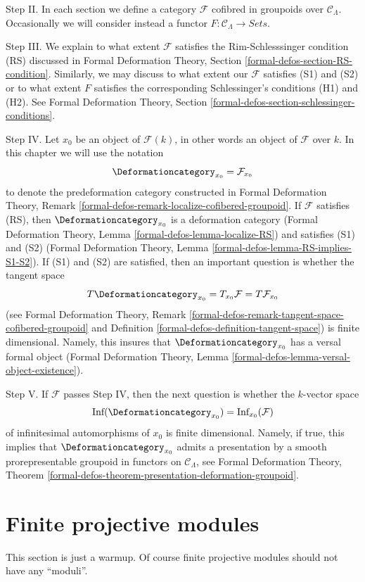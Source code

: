\medskip\noindent
Step II. In each section we define a category $\mathcal{F}$
cofibred in groupoids over $\mathcal{C}_\Lambda$. Occasionally
we will consider instead a functor
$F : \mathcal{C}_\Lambda \to \textit{Sets}$.

\medskip\noindent
Step III. We explain to what extent $\mathcal{F}$ satisfies
the Rim-Schlesssinger condition (RS) discussed in
Formal Deformation Theory, Section \ref{formal-defos-section-RS-condition}.
Similarly, we may discuss to what extent our $\mathcal{F}$
satisfies (S1) and (S2) or to what extent $F$ satisfies
the corresponding Schlessinger's conditions (H1) and (H2).
See Formal Deformation Theory, Section
\ref{formal-defos-section-schlessinger-conditions}.

\medskip\noindent
Step IV. Let $x_0$ be an object of $\mathcal{F}(k)$, in other words an object
of $\mathcal{F}$ over $k$. In this chapter we will use the notation
$$
\Deformationcategory_{x_0} = \mathcal{F}_{x_0}
$$
to denote the predeformation category constructed in
Formal Deformation Theory, Remark
\ref{formal-defos-remark-localize-cofibered-groupoid}.
If $\mathcal{F}$ satisfies (RS), then
$\Deformationcategory_{x_0}$ is a deformation category
(Formal Deformation Theory, Lemma
\ref{formal-defos-lemma-localize-RS})
and satisfies (S1) and (S2)
(Formal Deformation Theory, Lemma
\ref{formal-defos-lemma-RS-implies-S1-S2}).
If (S1) and (S2) are satisfied, then
an important question is whether the tangent space
$$
T\Deformationcategory_{x_0} = T_{x_0}\mathcal{F} = T\mathcal{F}_{x_0}
$$
(see Formal Deformation Theory, Remark
\ref{formal-defos-remark-tangent-space-cofibered-groupoid} and
Definition \ref{formal-defos-definition-tangent-space})
is finite dimensional. Namely, this insures that
$\Deformationcategory_{x_0}$ has a versal formal object
(Formal Deformation Theory, Lemma
\ref{formal-defos-lemma-versal-object-existence}).

\medskip\noindent
Step V. If $\mathcal{F}$ passes Step IV, then the next question is whether
the $k$-vector space
$$
\text{Inf}(\Deformationcategory_{x_0}) = \text{Inf}_{x_0}(\mathcal{F})
$$
of infinitesimal automorphisms of $x_0$ is finite dimensional.
Namely, if true, this implies that
$\Deformationcategory_{x_0}$ admits a presentation by a
smooth prorepresentable groupoid in functors on $\mathcal{C}_\Lambda$, see
Formal Deformation Theory, Theorem
\ref{formal-defos-theorem-presentation-deformation-groupoid}.

\section{Finite projective modules}
\label{examples-defos-section-finite-projective-modules}
This section is just a warmup. Of course finite projective modules
should not have any ``moduli''.

